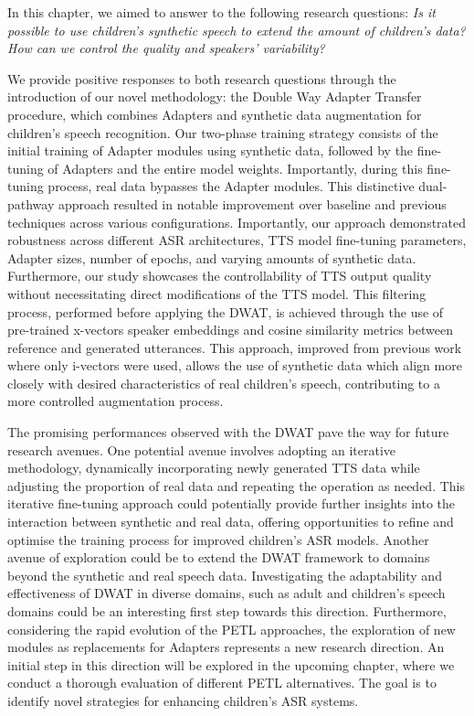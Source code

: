 In this chapter, we aimed to answer to the following research questions: \textit{Is it possible to use children's synthetic speech to extend the amount of children's data? How can we control the quality and speakers’ variability?}

We provide positive responses to both research questions through the introduction of our novel methodology: the Double Way Adapter Transfer procedure, which combines Adapters and synthetic data augmentation for children's speech recognition. Our two-phase training strategy consists of the initial training of Adapter modules using synthetic data, followed by the fine-tuning of Adapters and the entire model weights. Importantly, during this fine-tuning process, real data bypasses the Adapter modules. This distinctive dual-pathway approach resulted in notable improvement over baseline and previous techniques across various configurations. Importantly, our approach demonstrated robustness across different \ac{ASR} architectures, \ac{TTS} model fine-tuning parameters, Adapter sizes, number of epochs, and varying amounts of synthetic data. Furthermore, our study showcases the controllability of \ac{TTS} output quality without necessitating direct modifications of the \ac{TTS} model. This filtering process, performed before applying the \ac{DWAT}, is achieved through the use of pre-trained x-vectors speaker embeddings and cosine similarity metrics between reference and generated utterances. This approach, improved from previous work where only i-vectors were used\cite{wang2021towards}, allows the use of synthetic data which align more closely with desired characteristics of real children's speech, contributing to a more controlled augmentation process.

The promising performances observed with the \ac{DWAT} pave the way for future research avenues. One potential avenue involves adopting an iterative methodology, dynamically incorporating newly generated \ac{TTS} data while adjusting the proportion of real data and repeating the operation as needed. This iterative fine-tuning approach could potentially provide further insights into the interaction between synthetic and real data, offering opportunities to refine and optimise the training process for improved children's \ac{ASR} models.
Another avenue of exploration could be to extend the \ac{DWAT} framework to domains beyond the synthetic and real speech data. Investigating the adaptability and effectiveness of \ac{DWAT} in diverse domains, such as adult and children's speech domains could be an interesting first step towards this direction.
Furthermore, considering the rapid evolution of the \ac{PETL} approaches, the exploration of new modules as replacements for Adapters represents a new research direction. An initial step in this direction will be explored in the upcoming chapter, where we conduct a thorough evaluation of different \ac{PETL} alternatives. The goal is to identify novel strategies for enhancing children's \ac{ASR} systems.